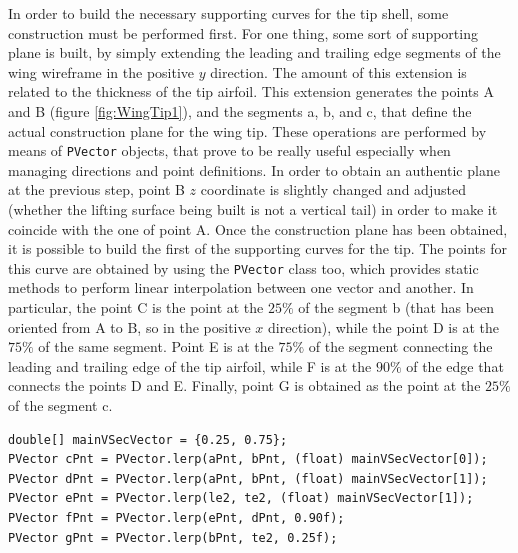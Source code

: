 \bigskip
\noindent
In order to build the necessary supporting curves for the tip shell, some construction must be performed first. For one thing, some sort of supporting plane is built, by simply extending the leading and trailing edge segments of the wing wireframe in the positive $y$ direction. The amount of this extension is related to the thickness of the tip airfoil. This extension generates the points A and B (figure \ref{fig:WingTip1}), and the segments a, b, and c, that define the actual construction plane for the wing tip. These operations are performed by means of \lstinline[language=Java]!PVector! objects, that prove to be really useful especially when managing directions and point definitions. In order to obtain an authentic plane at the previous step, point B $z$ coordinate is slightly changed and adjusted (whether the lifting surface being built is not a vertical tail) in order to make it coincide with the one of point A. Once the construction plane has been obtained, it is possible to build the first of the supporting curves for the tip. The points for this curve are obtained by using the \lstinline[language=Java]!PVector! class too, which provides static methods to perform linear interpolation between one vector and another. In particular, the point C is the point at the $25\%$ of the segment b (that has been oriented from A to B, so in the positive $x$ direction), while the point D is at the $75\%$ of the same segment. Point E is at the $75\%$ of the segment connecting the leading and trailing edge of the tip airfoil, while F is at the $90\%$ of the edge that connects the points D and E. Finally, point G is obtained as the point at the $25\%$ of the segment c. 
%
\bigskip
\begin{lstlisting}[caption={Points for the in-plane tip construction curve}, captionpos=b, tabsize=2, label={lst:ConstCurvePnts}]
double[] mainVSecVector = {0.25, 0.75};
PVector cPnt = PVector.lerp(aPnt, bPnt, (float) mainVSecVector[0]);
PVector dPnt = PVector.lerp(aPnt, bPnt, (float) mainVSecVector[1]);	
PVector ePnt = PVector.lerp(le2, te2, (float) mainVSecVector[1]);
PVector fPnt = PVector.lerp(ePnt, dPnt, 0.90f);	
PVector gPnt = PVector.lerp(bPnt, te2, 0.25f);
\end{lstlisting}

